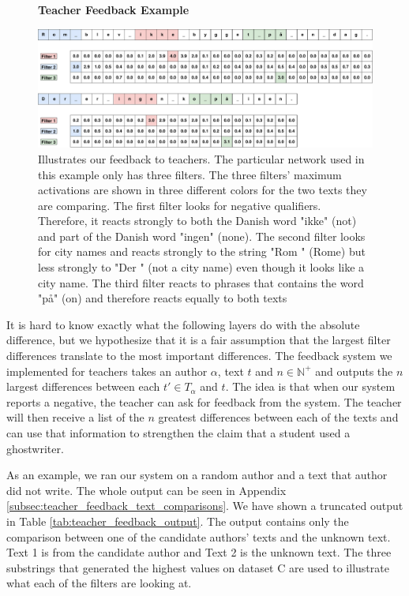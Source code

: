 \begin{figure}
    \centering
    \textbf{Teacher Feedback Example}\par\medskip
    \includegraphics[width=\textwidth]{./pictures/discussion/teacher_feedback_example}
    \caption{Illustrates our feedback to teachers. The particular network
    used in this example only has three filters. The three filters' maximum
    activations are shown in three different colors for the two texts they are
    comparing. The first filter looks for negative qualifiers. Therefore, it
    reacts strongly to both the Danish word "ikke" (not) and part of the Danish
    word "ingen" (none). The second filter looks for city names and reacts
    strongly to the string "Rom " (Rome) but less strongly to "Der " (not a city
    name) even though it looks like a city name. The third filter reacts to
    phrases that contains the word "p\aa " (on) and therefore reacts equally to
    both texts}
    \label{fig:feature_extraction_output_example}
\end{figure}

It is hard to know exactly what the following layers do with the absolute
difference, but we hypothesize that it is a fair assumption that the largest
filter differences translate to the most important differences. The feedback
system we implemented for teachers takes an author $\alpha$, text $t$ and $n
\in \mathbb{N}^+$ and outputs the $n$ largest differences between each $t' \in
T_\alpha$ and $t$. The idea is that when our system reports a negative, the
teacher can ask for feedback from the system. The teacher will then receive a
list of the $n$ greatest differences between each of the texts and can use that
information to strengthen the claim that a student used a ghostwriter.

As an example, we ran our system on a random author and a text 
that author did not write. The whole output can be seen in Appendix
\ref{subsec:teacher_feedback_text_comparisons}. We have shown a truncated
output in Table \ref{tab:teacher_feedback_output}. The output contains only
the comparison between one of the candidate authors' texts and the unknown
text. Text 1 is from the candidate author and Text 2 is the unknown text. 
The three substrings that generated the highest values on dataset \gls{C}
are used to illustrate what each of the filters are looking at.

